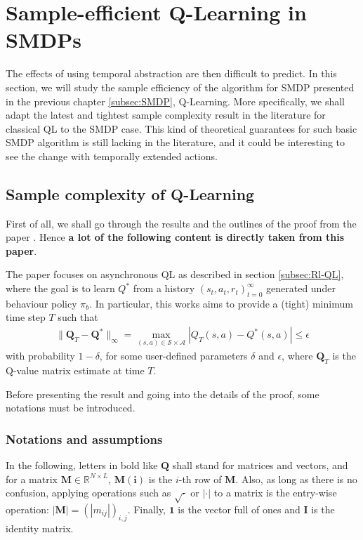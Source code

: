 \chapter{Sample-efficient Q-Learning in SMDPs}
\label{Chapter4}

The effects of using temporal abstraction are then difficult to predict. In this section, we will study the sample efficiency of the algorithm for SMDP presented in the previous chapter \ref{subsec:SMDP}, Q-Learning. More specifically, we shall adapt the latest and tightest sample complexity result in the literature for classical QL to the SMDP case. This kind of theoretical guarantees for such basic SMDP algorithm is still lacking in the literature, and it could be interesting to see the change with temporally extended actions.

\section{Sample complexity of Q-Learning}
\label{sec:SC-QL}

First of all, we shall go through the results and the outlines of the proof from the paper \citep{li_sample_2021}. Hence \textbf{a lot of the following content is directly taken from this paper}.

The paper focuses on asynchronous QL as described in section \ref{subsec:Rl-QL}, where the goal is to learn $Q^*$ from a history $\left( s_t, a_t, r_t \right)_{t=0}^\infty$ generated under behaviour policy $\pi_b$. In particular, this works aims to provide a (tight) minimum time step $T$ such that
\begin{align}
  \|\mathbf{Q}_T - \mathbf{Q}^*\|_\infty = \max_{(s,a) \in \mathcal{S}\times \mathcal{A}} |Q_T(s,a) - Q^*(s,a)| \leq \epsilon \label{SC-def}
\end{align}
with probability $1-\delta$, for some user-defined parameters $\delta$ and $\epsilon$, where $\mathbf{Q}_T$ is the Q-value matrix estimate at time $T$.

Before presenting the result and going into the details of the proof, some notations must be introduced.

\subsection{Notations and assumptions}
\label{subsec:notations}

In the following, letters in bold like $\mathbf{Q}$ shall stand for matrices and vectors, and for a matrix $\mathbf{M} \in \mathbb{R}^{N\times L}$, $\mathbf{M(i)}$ is the $i$-th row of $\mathbf{M}$. Also, as long as there is no confusion, applying operations such as $\sqrt{\cdot}$ or $|\cdot|$ to a matrix is the entry-wise operation: $|\mathbf{M}| = (|m_{ij}|)_{i,j}$. Finally, $\mathbf{1}$ is the vector full of ones and $\mathbf{I}$ is the identity matrix.

